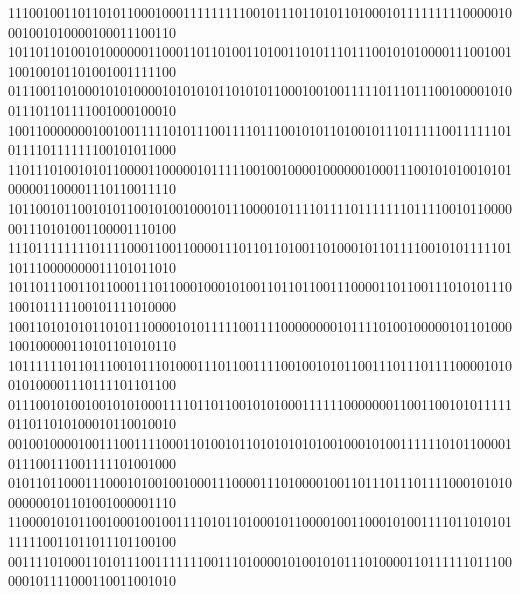 \documentclass[10pt,\tflang,dvips]{book}
\begin{document}
{{\begin{minipage}{\oldpwidth}
{{{{111001001101101011000100011111111100101110110101101000101111111110000010001001010000100011100110\blue\\
101101101001010000001100011011010011010011010111011100101010000111001001100100101101001001111100\blue\\
011100110100010101000010101010110101011000100100111110111011100100001010011101101111001000100010\blue\\
100110000000100100111110101110011110111001010110100101110111110011111101011110111111100101011000\blue\\
110111010010101100001100000101111100100100001000000100011100101010010101000001100001110110011110\blue\\
101100101100101011001010010001011100001011110111101111111011110010110000001110101001100001110100\blue\\
111011111111011110001100110000111011011010011010001011011110010101111101101110000000011101011010\blue\\
101101110011011000111011000100010100110110110011100001101100111010101110100101111100101111010000\blue\\
100110101010110101110000101011111001111000000001011110100100000101101000100100000110101101010110\blue\\
101111110110111001011101000111011001111001001010110011101110111100001010010100001110111101101100\blue\\
011100101001001010100011110110110010101000111111000000011001100101011111011011010100010110010010\blue\\
001001000010011100111100011010010110101010101001000101001111110101100001011100111001111101001000\blue\\
010110110001110001010010010001110000111010000100110111011101111000101010000000101101001000001110\blue\\
110000101011001000100100111101011010001011000010011000101001111011010101111110011011011101100100\blue\\
001111010001101011100111111100111010000101001010111010000110111111011100000101111000110011001010\blue\\
}}}}
\end{minipage}}}
\end{document}
